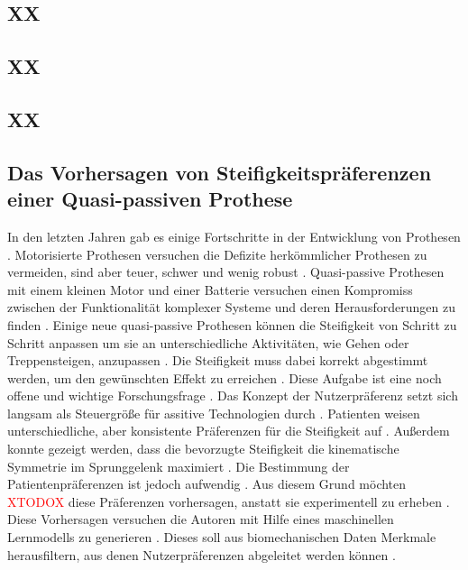 \subsection{XX}
\cite{Louessard.2022} %

\subsection{XX}
\cite{Vaca.2022} %

\subsection{XX}
\cite{InstituteofElectricalandElectronicsEngineers.2024} %

\subsection{Das Vorhersagen von Steifigkeitspräferenzen einer Quasi-passiven Prothese}






In den letzten Jahren gab es einige Fortschritte in der Entwicklung von Prothesen \cite{Shetty.2022}. Motorisierte Prothesen versuchen die Defizite herkömmlicher Prothesen zu vermeiden, sind aber teuer, schwer und wenig robust \cite{Shetty.2022}. Quasi-passive Prothesen mit einem kleinen Motor und einer Batterie versuchen einen Kompromiss zwischen der Funktionalität komplexer Systeme und deren Herausforderungen zu finden \cite{Shetty.2022}. 
Einige neue quasi-passive Prothesen können die Steifigkeit von Schritt zu Schritt anpassen um sie an unterschiedliche Aktivitäten, wie Gehen oder Treppensteigen, anzupassen \cite{Shetty.2022}. Die Steifigkeit muss dabei korrekt abgestimmt werden, um den gewünschten Effekt zu erreichen \cite{Shetty.2022}. Diese Aufgabe ist eine noch offene und wichtige Forschungsfrage \cite{Shetty.2022}. Das Konzept der Nutzerpräferenz setzt sich langsam als Steuergröße für assitive Technologien durch \cite{Shetty.2022}. Patienten weisen unterschiedliche, aber konsistente Präferenzen für die Steifigkeit auf \cite{Shetty.2022}. Außerdem konnte gezeigt werden, dass die bevorzugte Steifigkeit die kinematische Symmetrie im Sprunggelenk maximiert \cite{Shetty.2022}. Die Bestimmung der Patientenpräferenzen ist jedoch aufwendig \cite{Shetty.2022}. Aus diesem Grund möchten \textcolor{red}{XTODOX} diese Präferenzen vorhersagen, anstatt sie experimentell zu erheben \cite{Shetty.2022}. Diese Vorhersagen versuchen die Autoren mit Hilfe eines maschinellen Lernmodells zu generieren \cite{Shetty.2022}. Dieses soll aus biomechanischen Daten Merkmale herausfiltern, aus denen Nutzerpräferenzen abgeleitet werden können \cite{Shetty.2022}. 


